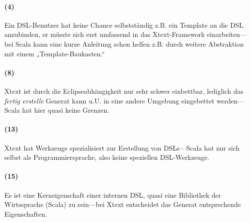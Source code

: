 \paragraph{(4)} Ein DSL-Benutzer hat keine Chance selbstständig
z.B. ein Template an die DSL anzubinden, er müsste sich erst umfassend
in das Xtext-Framework einarbeiten---bei Scala kann eine kurze Anleitung
schon helfen z.B. durch weitere Abstraktion mit einem „Template-Baukasten.“

\paragraph{(8)} Xtext ist durch die Eclipseabhängigkeit nur sehr schwer
einbettbar, lediglich das \emph{fertig erstelle} Generat kann u.U. in eine andere
Umgebung eingebettet werden---Scala hat hier quasi keine Grenzen.

\paragraph{(13)} Xtext hat Werkzeuge spezialisiert zur Erstellung von
DSLs---Scala hat nur sich selbst als Programmiersprache, also keine speziellen
DSL-Werkzeuge.

\paragraph{(15)} Es ist eine Kerneigenschaft einer internen DSL, quasi
eine Bibliothek der Wirtssprache (Scala) zu sein---bei Xtext entscheidet
das Generat entsprechende Eigenschaften.
